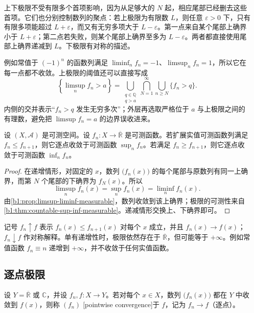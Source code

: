上下极限不受有限多个首项影响，因为从足够大的 \(N\) 起，相应尾部已经删去这些首项。它们也分别控制数列的聚点：若上极限为有限数 \(L\)，则任意 \(\varepsilon>0\) 下，只有有限多项能超过 \(L+\varepsilon\)，而又有无穷多项大于 \(L-\varepsilon\)。第一点来自某个尾部上确界小于 \(L+\varepsilon\)；第二点若失败，则某个尾部上确界至多为 \(L-\varepsilon\)。两者都直接使用尾部上确界递减到 \(L\)。下极限有对称的描述。

\ProseParagraphBreak

例如常值于 \((-1)^n\) 的函数列满足
\(\liminf_nf_n=-1\)、\(\limsup_nf_n=1\)，所以它在每一点都不收敛。上极限的阈值还可以直接写成
\[
\left\{\limsup_nf_n>a\right\}
=\bigcup_{\substack{q\in\mathbb Q\\q>a}}
\bigcap_{N=1}^{\infty}\bigcup_{n\geq N}\{f_n>q\}.
\]
内侧的交并表示“\(f_n>q\) 发生无穷多次”；外层再选取严格位于 \(a\) 与上极限之间的有理数，避免把 \(\limsup f_n=a\) 的边界误收进来。

\begin{corollary}
\label{b1:cor:monotone-function-limit}
设 \((X,\mathcal A)\) 是可测空间。设 \(f_n:X\to\overline{\mathbb R}\) 是可测函数。若扩展实值可测函数列满足 \(f_n\leq f_{n+1}\)，则它逐点收敛于可测函数 \(\sup_nf_n\)。若满足 \(f_n\geq f_{n+1}\)，则它逐点收敛于可测函数 \(\inf_nf_n\)。
\end{corollary}
\begin{proof}
在递增情形，对固定的 \(x\)，数列 \(\bigl(f_n(x)\bigr)\) 的每个尾部与原数列有同一上确界，而第 \(N\) 个尾部的下确界为 \(f_N(x)\)。所以
\[
\limsup_nf_n(x)=\sup_nf_n(x)
=\liminf_nf_n(x).
\]
由\cref{b1:prop:limsup-liminf-measurable}，数列收敛到该上确界；极限的可测性来自\cref{b1:thm:countable-sup-inf-measurable}。递减情形交换上、下确界即可。
\end{proof}

记号 \(f_n\uparrow f\) 表示 \(f_n(x)\leq f_{n+1}(x)\) 对每个 \(x\) 成立，并且 \(f_n(x)\to f(x)\)；\(f_n\downarrow f\) 作对称解释。单有递增性时，极限依然存在于 \(\overline{\mathbb R}\)，但可能等于 \(+\infty\)。例如常值函数 \(f_n\equiv n\) 递增到 \(+\infty\)，并不收敛于任何实值函数。

\subsection{逐点极限}
\label{b1:subsec:040203}

\begin{definition}
\label{b1:def:pointwise-convergence}
设 \(Y=\overline{\mathbb R}\) 或 \(\mathbb C\)，并设 \(f_n,f:X\rightarrow Y\)。若对每个 \(x\in X\)，数列 \(\bigl(f_n(x)\bigr)\) 都在 \(Y\) 中收敛到 \(f(x)\)，则称 \((f_n)\) [pointwise convergence]于 \(f\)，记为 \(f_n\to f\)（逐点）。
\end{definition}

